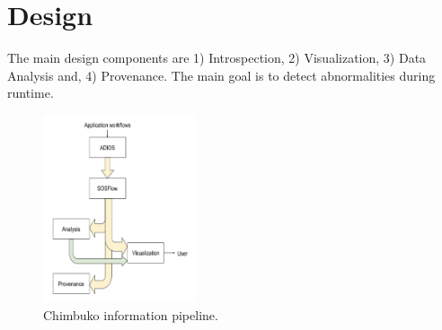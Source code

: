 \section{Design}
The main design components are 1) Introspection, 2) Visualization, 3) Data Analysis and, 4) Provenance. The main goal is to detect  abnormalities during runtime.

\begin{figure}[th!]
 \centering
  \includegraphics[width=0.4\textwidth]{Figs/design_Y2}
 \caption{Chimbuko information pipeline.}
\label{designfig:1}     
 \end{figure}


